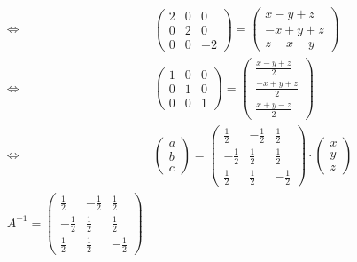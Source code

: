 \documentclass[notitlepage]{math}
\begin{document}
\begin{align*}
        \Longleftrightarrow &
        \begin{pmatrix}
            2 & 0 & 0 \\
            0 & 2 & 0 \\
            0 & 0  & -2
        \end{pmatrix} =
        \begin{pmatrix}
            x - y + z \\
            -x + y + z \\
            z - x - y
        \end{pmatrix} \\
        \Longleftrightarrow &
        \begin{pmatrix}
            1 & 0 & 0 \\
            0 & 1 & 0 \\
            0 & 0  & 1
        \end{pmatrix} = 
        \begin{pmatrix}
            \frac{x - y + z}{2} \\
            \frac{-x + y + z}{2} \\
            \frac{x + y - z}{2}
        \end{pmatrix} \\
        \Longleftrightarrow &
        \begin{pmatrix}
            a \\
            b \\
            c
        \end{pmatrix} =
        \begin{pmatrix}
            \frac{1}{2} & -\frac{1}{2} & \frac{1}{2} \\ 
            -\frac{1}{2} & \frac{1}{2} & \frac{1}{2} \\
            \frac{1}{2} & \frac{1}{2} & -\frac{1}{2}
        \end{pmatrix} \cdot
        \begin{pmatrix}
            x \\
            y \\
            z
        \end{pmatrix} \\
        A ^{-1} = \begin{pmatrix}
            \frac{1}{2} & -\frac{1}{2} & \frac{1}{2} \\ 
            -\frac{1}{2} & \frac{1}{2} & \frac{1}{2} \\
            \frac{1}{2} & \frac{1}{2} & -\frac{1}{2}
        \end{pmatrix}
\end{align*}
        
\end{document}
